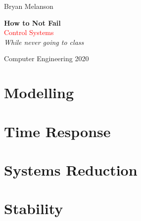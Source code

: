 \documentclass[11pt]{article}
\newcommand*{\plogo}{\fbox{$\mathcal{BM}$}}
\begin{document}
 
        
    \begin{titlepage}
    
        \raggedleft
        
        \vspace*{\baselineskip}
        
        {\Large Bryan Melanson}
        
        \vspace*{0.167\textheight}
        
        \textbf{\LARGE How to Not Fail}\\[\baselineskip]
        
        {\textcolor{Red}{\Huge Control Systems}}\\[\baselineskip]
        
        {\Large \textit{While never going to class}}
        
        \vfill
        
        {\large Computer Engineering 2020 ~~\plogo}
        
        \vspace*{3\baselineskip}
    
    \end{titlepage}

    \pagebreak
    
    \tableofcontents

    
    \section{Modelling}
    

    \section{Time Response}
    
    
    \section{Systems Reduction}


    \section{Stability}
\end{document}
